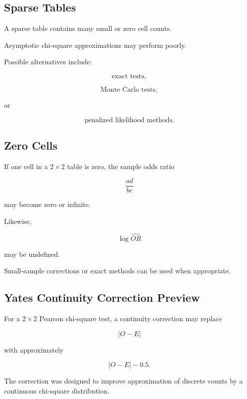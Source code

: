 \subsection{Sparse Tables}
\label{subsec:sparse-contingency-tables}

A sparse table contains many small or zero cell counts.

Asymptotic chi-square approximations may perform poorly.

Possible alternatives include:

\[
\boxed{
\text{exact tests},
}
\]

\[
\boxed{
\text{Monte Carlo tests},
}
\]

or

\[
\boxed{
\text{penalized likelihood methods}.
}
\]

\subsection{Zero Cells}
\label{subsec:zero-cells}

If one cell in a \(2\times2\) table is zero, the sample odds ratio

\[
\frac{ad}{bc}
\]

may become zero or infinite.

Likewise,

\[
\log\widehat{OR}
\]

may be undefined.

Small-sample corrections or exact methods can be used when appropriate.

\subsection{Yates Continuity Correction Preview}
\label{subsec:yates-correction}

For a \(2\times2\) Pearson chi-square test, a continuity correction may
replace

\[
|O-E|
\]

with approximately

\[
\boxed{
|O-E|-0.5.
}
\]

The correction was designed to improve approximation of discrete counts
by a continuous chi-square distribution.

